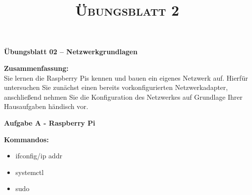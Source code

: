 \documentclass[paper=a4,fontsize=11pt]{scrartcl}%
\title{	
\normalfont \normalsize 
\textsc{Übungsblatt 2}
}
\numberwithin{equation}{section}
\begin{document}
\begin{center}
\Large{\textbf{Übungsblatt 02 -- Netzwerkgrundlagen}}
\end{center}
\textbf{Zusammenfassung:}\\
Sie lernen die Raspberry Pis kennen und bauen ein eigenes Netzwerk auf. Hierfür untersuchen Sie zunächst einen bereits vorkonfigurierten Netzwerkadapter, anschließend nehmen Sie die Konfiguration des Netzwerkes auf Grundlage Ihrer Hausaufgaben händisch vor.
\begin{center}\Large{\textbf{Aufgabe A - Raspberry Pi}}\end{center}\vskip0.25in
\textbf{Kommandos:}
\begin{multicols}{3}
\begin{itemize}
	\item ifconfig/ip addr
	\item systemctl
	\item sudo
\end{itemize}
\end{multicols}
\end{document}
